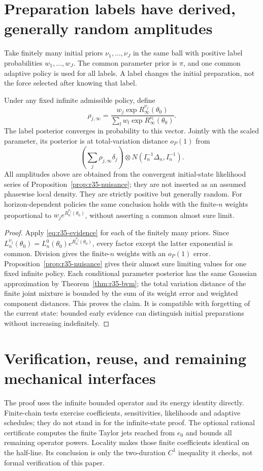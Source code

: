 \section{Preparation labels have derived, generally random amplitudes}
\label{sec:r35-preparation}
Take finitely many initial priors $\nu_1,\ldots,\nu_J$ in the same ball with positive label probabilities $w_1,\ldots,w_J$. The common parameter prior is $\pi$, and one common adaptive policy is used for all labels. A label changes the initial preparation, not the force selected after knowing that label.

\begin{theorem}\label{thm:r35-labels}
Under any fixed infinite admissible policy, define
\[
 \rho_{j,\infty}=
 \frac{w_j\exp R_\infty^{\nu_j}(\theta_0)}
      {\sum_lw_l\exp R_\infty^{\nu_l}(\theta_0)}.
\]
The label posterior converges in probability to this vector. Jointly with the scaled parameter, its posterior is at total-variation distance $o_P(1)$ from
\[
 \left(\sum_j\rho_{j,\infty}\delta_j\right)
          \otimes N(I_n^{-1}\Delta_n,I_n^{-1}).
\]
All amplitudes above are obtained from the convergent initial-state likelihood series of Proposition~\ref{prop:r35-nuisance}; they are not inserted as an assumed phasewise local density. They are strictly positive but generally random. For horizon-dependent policies the same conclusion holds with the finite-$n$ weights proportional to $w_j e^{R_n^{\nu_j}(\theta_0)}$, without asserting a common almost sure limit.
\end{theorem}
\begin{proof}
Apply \eqref{eq:r35-evidence} for each of the finitely many priors. Since $L_n^{\nu_j}(\theta_0)=L_n^0(\theta_0)e^{R_n^{\nu_j}(\theta_0)}$, every factor except the latter exponential is common. Division gives the finite-$n$ weights with an $o_P(1)$ error. Proposition~\ref{prop:r35-nuisance} gives their almost sure limiting values for one fixed infinite policy. Each conditional parameter posterior has the same Gaussian approximation by Theorem~\ref{thm:r35-bvm}; the total variation distance of the finite joint mixture is bounded by the sum of its weight error and weighted component distances. This proves the claim. It is compatible with forgetting of the current state: bounded early evidence can distinguish initial preparations without increasing indefinitely.
\end{proof}

\section{Verification, reuse, and remaining mechanical interfaces}
\label{sec:r35-interfaces}
The proof uses the infinite bounded operator and its energy identity directly. Finite-chain tests exercise coefficients, sensitivities, likelihoods and adaptive schedules; they do not stand in for the infinite-state proof. The optional rational certificate computes the finite Taylor jets reached from $e_0$ and bounds all remaining operator powers. Locality makes those finite coefficients identical on the half-line. Its conclusion is only the two-duration $C^1$ inequality it checks, not formal verification of this paper.

